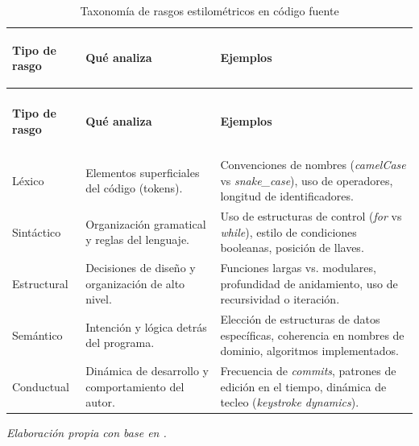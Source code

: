 { %
\renewcommand{\arraystretch}{1.6}
\small

\begin{xltabular}{\textwidth}{>{\bfseries\raggedright\arraybackslash}p{2.8cm} >{\raggedright\arraybackslash}p{3.5cm} >{\raggedright\arraybackslash}X}
    \caption{Taxonomía de rasgos estilométricos en código fuente} \label{tab:rasgos_estilometricos} \\
    
    \toprule
    \textbf{Tipo de rasgo} & \textbf{Qué analiza} & \textbf{Ejemplos} \\
    \midrule
    \endfirsthead

     \\
    \toprule
    \textbf{Tipo de rasgo} & \textbf{Qué analiza} & \textbf{Ejemplos} \\
    \midrule
    \endhead

    \midrule
     \\
    \endfoot

    \bottomrule
    \endlastfoot

    
    Léxico & Elementos superficiales del código (tokens). & Convenciones de nombres (\textit{camelCase} vs \textit{snake\_case}), uso de operadores, longitud de identificadores. \\
    \addlinespace
    
    Sintáctico & Organización gramatical y reglas del lenguaje. & Uso de estructuras de control (\textit{for} vs \textit{while}), estilo de condiciones booleanas, posición de llaves. \\
    \addlinespace
    
    Estructural & Decisiones de diseño y organización de alto nivel. & Funciones largas vs. modulares, profundidad de anidamiento, uso de recursividad o iteración. \\
    \addlinespace
    
    Semántico & Intención y lógica detrás del programa. & Elección de estructuras de datos específicas, coherencia en nombres de dominio, algoritmos implementados. \\
    \addlinespace
    
    Conductual & Dinámica de desarrollo y comportamiento del autor. & Frecuencia de \textit{commits}, patrones de edición en el tiempo, dinámica de tecleo (\textit{keystroke dynamics}). \\

\end{xltabular}

\nopagebreak
\footnotesize\textit{Elaboración propia con base en \cite{Horvath2026ProgrammerAttribution}.}

} %

